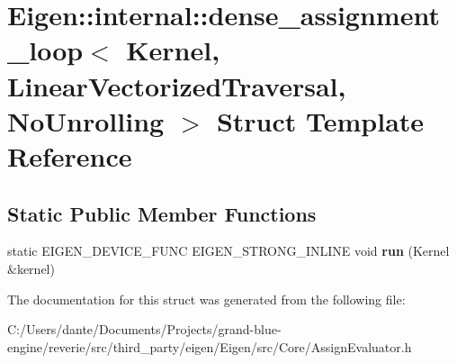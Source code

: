 \hypertarget{struct_eigen_1_1internal_1_1dense__assignment__loop_3_01_kernel_00_01_linear_vectorized_traversal_00_01_no_unrolling_01_4}{}\section{Eigen\+::internal\+::dense\+\_\+assignment\+\_\+loop$<$ Kernel, Linear\+Vectorized\+Traversal, No\+Unrolling $>$ Struct Template Reference}
\label{struct_eigen_1_1internal_1_1dense__assignment__loop_3_01_kernel_00_01_linear_vectorized_traversal_00_01_no_unrolling_01_4}
\subsection*{Static Public Member Functions}
\begin{DoxyCompactItemize}
\item 
\mbox{\label{struct_eigen_1_1internal_1_1dense__assignment__loop_3_01_kernel_00_01_linear_vectorized_traversal_00_01_no_unrolling_01_4_a540279ab58209006a325677a33995c1a}} 
static E\+I\+G\+E\+N\+\_\+\+D\+E\+V\+I\+C\+E\+\_\+\+F\+U\+NC E\+I\+G\+E\+N\+\_\+\+S\+T\+R\+O\+N\+G\+\_\+\+I\+N\+L\+I\+NE void {\bfseries run} (Kernel \&kernel)
\end{DoxyCompactItemize}


The documentation for this struct was generated from the following file\+:\begin{DoxyCompactItemize}
\item 
C\+:/\+Users/dante/\+Documents/\+Projects/grand-\/blue-\/engine/reverie/src/third\+\_\+party/eigen/\+Eigen/src/\+Core/Assign\+Evaluator.\+h\end{DoxyCompactItemize}
